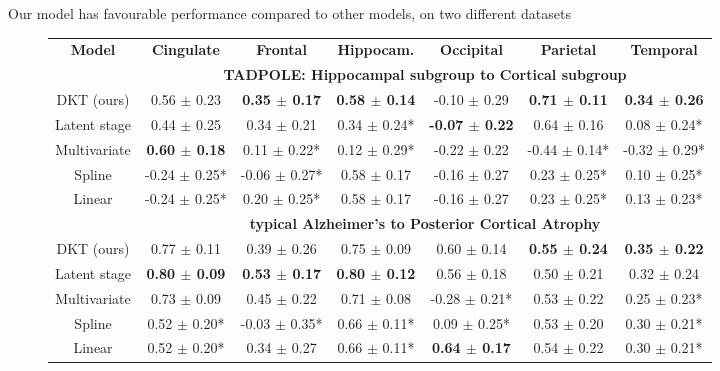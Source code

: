 \documentclass[portrait,a0,final,20pt]{a0poster}
\newcommand{\fnt}[1]{\LARGE{#1}}
\begin{document}
{\begin{multicols}{2}
\noindent \fnt{Our model has favourable performance compared to other models, on two different datasets}
\vspace{0.3em}
\begin{figure}[H]
\fontsize{27}{30}\selectfont
\begin{tabular}{c | c c c c c c}
\textbf{Model} & \textbf{Cingulate} & \textbf{Frontal} & \textbf{Hippocam.} & \textbf{Occipital} & \textbf{Parietal} & \textbf{Temporal}\\
& \multicolumn{6}{c}{\textbf{TADPOLE: Hippocampal subgroup to Cortical subgroup}}\\
DKT (ours) &      0.56 $\pm$ 0.23 &    \textbf{0.35 $\pm$ 0.17} &        \textbf{0.58 $\pm$ 0.14} &     -0.10 $\pm$ 0.29 &     \textbf{0.71 $\pm$ 0.11} &     \textbf{0.34 $\pm$ 0.26} \\
Latent stage &      0.44 $\pm$ 0.25 &    0.34 $\pm$ 0.21 &       0.34 $\pm$ 0.24* &     \textbf{-0.07 $\pm$ 0.22} &     0.64 $\pm$ 0.16 &    0.08 $\pm$ 0.24* \\
Multivariate &      \textbf{0.60 $\pm$ 0.18} &   0.11 $\pm$ 0.22* &       0.12 $\pm$ 0.29* &     -0.22 $\pm$ 0.22 &   -0.44 $\pm$ 0.14* &   -0.32 $\pm$ 0.29* \\
Spline &    -0.24 $\pm$ 0.25* &  -0.06 $\pm$ 0.27* &        0.58 $\pm$ 0.17 &     -0.16 $\pm$ 0.27 &    0.23 $\pm$ 0.25* &    0.10 $\pm$ 0.25* \\
Linear &    -0.24 $\pm$ 0.25* &   0.20 $\pm$ 0.25* &        0.58 $\pm$ 0.17 &     -0.16 $\pm$ 0.27 &    0.23 $\pm$ 0.25* &    0.13 $\pm$ 0.23* \\
& \multicolumn{6}{c}{\textbf{typical Alzheimer's to Posterior Cortical Atrophy}}\\
DKT (ours) &    0.77 $\pm$ 0.11 &    0.39 $\pm$ 0.26 &      0.75 $\pm$ 0.09 &    0.60 $\pm$ 0.14 &    \textbf{0.55 $\pm$ 0.24} &    \textbf{0.35 $\pm$ 0.22} \\
Latent stage &    \textbf{0.80 $\pm$ 0.09} &    \textbf{0.53 $\pm$ 0.17} &      \textbf{0.80 $\pm$ 0.12} &    0.56 $\pm$ 0.18 &    0.50 $\pm$ 0.21 &    0.32 $\pm$ 0.24 \\
Multivariate &   0.73 $\pm$ 0.09 &   0.45 $\pm$ 0.22  &    0.71 $\pm$ 0.08 & -0.28 $\pm$ 0.21* &  0.53 $\pm$ 0.22  &  0.25 $\pm$ 0.23* \\
Spline &   0.52 $\pm$ 0.20* &  -0.03 $\pm$ 0.35* &     0.66 $\pm$ 0.11* &   0.09 $\pm$ 0.25* &    0.53 $\pm$ 0.20 &   0.30 $\pm$ 0.21* \\
Linear &   0.52 $\pm$ 0.20* &    0.34 $\pm$ 0.27 &     0.66 $\pm$ 0.11* &    \textbf{0.64 $\pm$ 0.17} &    0.54 $\pm$ 0.22 &   0.30 $\pm$ 0.21* \\
\end{tabular}
\vspace{0.5em}
\label{sec:dktPerfMetrics}
\end{figure}



\end{multicols}}
\end{document}
